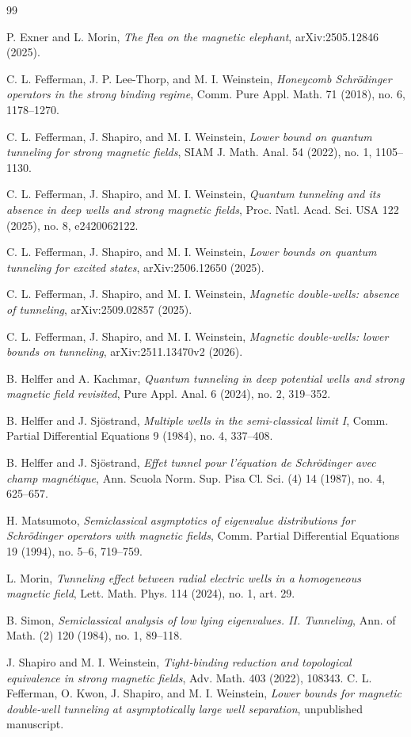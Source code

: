 \documentclass[11pt]{article}
\begin{document}
\begingroup
\small
\begin{thebibliography}{99}
\setlength{\itemsep}{1pt}
\setlength{\parskip}{0pt}

P. Exner and L. Morin,
\emph{The flea on the magnetic elephant},
arXiv:2505.12846 (2025).

C. L. Fefferman, J. P. Lee-Thorp, and M. I. Weinstein,
\emph{Honeycomb Schr\"odinger operators in the strong binding regime},
Comm. Pure Appl. Math. 71 (2018), no. 6, 1178--1270.

C. L. Fefferman, J. Shapiro, and M. I. Weinstein,
\emph{Lower bound on quantum tunneling for strong magnetic fields},
SIAM J. Math. Anal. 54 (2022), no. 1, 1105--1130.

C. L. Fefferman, J. Shapiro, and M. I. Weinstein,
\emph{Quantum tunneling and its absence in deep wells and strong magnetic fields},
Proc. Natl. Acad. Sci. USA 122 (2025), no. 8, e2420062122.

C. L. Fefferman, J. Shapiro, and M. I. Weinstein,
\emph{Lower bounds on quantum tunneling for excited states},
arXiv:2506.12650 (2025).

C. L. Fefferman, J. Shapiro, and M. I. Weinstein,
\emph{Magnetic double-wells: absence of tunneling},
arXiv:2509.02857 (2025).

C. L. Fefferman, J. Shapiro, and M. I. Weinstein,
\emph{Magnetic double-wells: lower bounds on tunneling},
arXiv:2511.13470v2 (2026).

B. Helffer and A. Kachmar,
\emph{Quantum tunneling in deep potential wells and strong magnetic field revisited},
Pure Appl. Anal. 6 (2024), no. 2, 319--352.

B. Helffer and J. Sj\"ostrand,
\emph{Multiple wells in the semi-classical limit I},
Comm. Partial Differential Equations 9 (1984), no. 4, 337--408.

B. Helffer and J. Sj\"ostrand,
\emph{Effet tunnel pour l'\'equation de Schr\"odinger avec champ magn\'etique},
Ann. Scuola Norm. Sup. Pisa Cl. Sci. (4) 14 (1987), no. 4, 625--657.

H. Matsumoto,
\emph{Semiclassical asymptotics of eigenvalue distributions for Schr\"odinger operators with magnetic fields},
Comm. Partial Differential Equations 19 (1994), no. 5--6, 719--759.

L. Morin,
\emph{Tunneling effect between radial electric wells in a homogeneous magnetic field},
Lett. Math. Phys. 114 (2024), no. 1, art. 29.

B. Simon,
\emph{Semiclassical analysis of low lying eigenvalues. II. Tunneling},
Ann. of Math. (2) 120 (1984), no. 1, 89--118.

J. Shapiro and M. I. Weinstein,
\emph{Tight-binding reduction and topological equivalence in strong magnetic fields},
Adv. Math. 403 (2022), 108343.
C. L. Fefferman, O. Kwon, J. Shapiro, and M. I. Weinstein,
\emph{Lower bounds for magnetic double-well tunneling at asymptotically large well separation},
unpublished manuscript.
\end{thebibliography}
\endgroup
\end{document}
